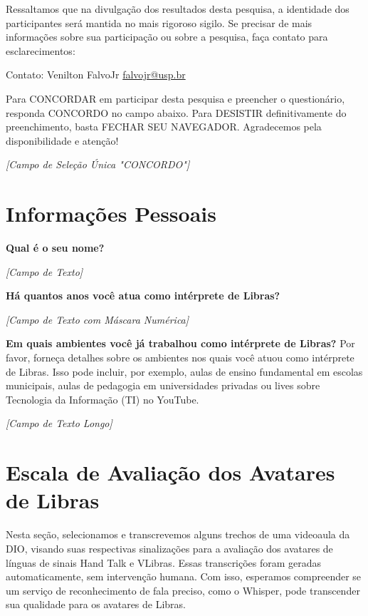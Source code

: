 \noindent
Ressaltamos que na divulgação dos resultados desta pesquisa, a identidade dos participantes 
será mantida no mais rigoroso sigilo. Se precisar de mais informações sobre sua participação 
ou sobre a pesquisa, faça contato para esclarecimentos: 

\noindent
Contato: Venilton FalvoJr \href{mailto:falvojr@usp.br}{falvojr@usp.br}

\noindent
Para CONCORDAR em participar desta pesquisa e preencher o questionário, responda CONCORDO no campo abaixo. Para DESISTIR definitivamente do preenchimento, basta FECHAR SEU NAVEGADOR. Agradecemos pela disponibilidade e atenção!

\noindent
\textit{[Campo de Seleção Única "CONCORDO"]}

\section{Informações Pessoais}

\noindent
\textbf{Qual é o seu nome?}

\noindent
\textit{[Campo de Texto]}

\noindent
\textbf{Há quantos anos você atua como intérprete de Libras?}

\noindent
\textit{[Campo de Texto com Máscara Numérica]}

\noindent
\textbf{Em quais ambientes você já trabalhou como intérprete de Libras?} 
Por favor, forneça detalhes sobre os ambientes nos quais você atuou como intérprete de Libras. Isso pode incluir, por exemplo, aulas de ensino fundamental em escolas municipais, aulas de pedagogia em universidades privadas ou lives sobre Tecnologia da Informação (TI) no YouTube.

\noindent
\textit{[Campo de Texto Longo]}

\section{Escala de Avaliação dos Avatares de Libras}

\noindent
Nesta seção, selecionamos e transcrevemos alguns trechos de uma videoaula da DIO, 
visando suas respectivas sinalizações para a avaliação dos avatares de línguas de sinais 
Hand Talk e VLibras. Essas transcrições foram geradas automaticamente, sem 
intervenção humana. Com isso, esperamos compreender se um serviço de 
reconhecimento de fala preciso, como o Whisper, pode transcender sua qualidade para os 
avatares de Libras.

